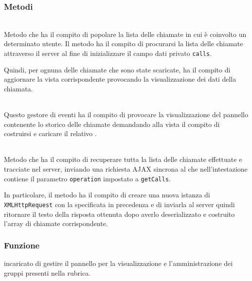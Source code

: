 \subsubsection*{Metodi}
\begin{description}

  \item{}\\
  Metodo che ha il compito di popolare la lista delle chiamate in cui è coinvolto un determinato utente. Il metodo ha il compito di procurarsi la lista delle chiamate attraverso il server al fine di inizializzare il campo dati privato \verb'calls'.
  
  Quindi, per ognuna delle chiamate che sono state scaricate, ha il compito di aggiornare la vista corrispondente provocando la visualizzazione dei dati della chiamata.
  
  \item{}\\
  Questo gestore di eventi ha il compito di provocare la visualizzazione del pannello contenente lo storico delle chiamate demandando alla vista il compito di costruirsi e caricare il relativo .
  
    \item{}\\
  Metodo che ha il compito di recuperare tutta la lista delle chiamate effettuate e tracciate nel server, inviando una richiesta AJAX sincrona al  che nell'intestazione contiene il parametro \verb'operation' impostato a \verb'getCalls'.
  
  In particolare, il metodo ha il compito di creare una nuova istanza di \verb'XMLHttpRequest' con la  specificata in precedenza e di inviarla al server quindi ritornare il testo della risposta ottenuta dopo averlo deserializzato e costruito l'array di chiamate corrispondente.

\end{description}







\subsubsection*{Funzione}
 incaricato di gestire il pannello per la visualizzazione e l'amministrazione dei gruppi presenti nella rubrica.


